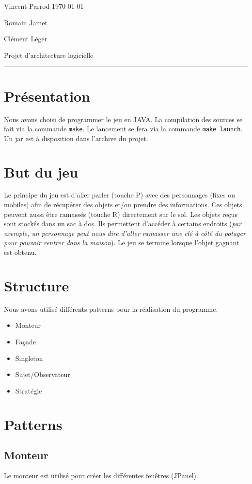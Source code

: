\documentclass[a4paper]{article}
\begin{document}
Vincent Parrod
\hfill
\today{}

Romain Jamet

Clément Léger
\begin{center}
    \huge{Projet d'architecture logicielle}
    \rule{0.5\textwidth}{0.4pt}
\end{center}
\section{Présentation}
Nous avons choisi de programmer le jeu en JAVA.  La compilation des sources se fait via la commande \verb+make+. Le lancement se fera via la commande \verb+make launch+. Un jar est à disposition dans l'archive du projet. 
\section{But du jeu}
Le principe du jeu est d'aller parler (touche P) avec des personnages (fixes ou mobiles) afin de récupérer des objets et/ou prendre des informations. Ces objets peuvent aussi être ramassés (touche R) directement sur le sol. Les objets reçus sont stockés dans un sac à dos. Ils permettent d'accéder à certains endroits (\textit{par exemple, un personnage peut nous dire d'aller ramasser une clé à côté du potager pour pouvoir rentrer dans la maison}). Le jeu se termine lorsque l'objet gagnant est obtenu. 
\section{Structure}
Nous avons utilisé différents patterns pour la réalisation du programme.
\begin{itemize}
\item Monteur  
\item Façade 
\item Singleton

\item Sujet/Observateur
\item Stratégie
\end{itemize}

\section{Patterns}
    \subsection{Monteur}
        Le monteur est utilisé pour créer les différentes fenêtres (JPanel).
    
\end{document}
